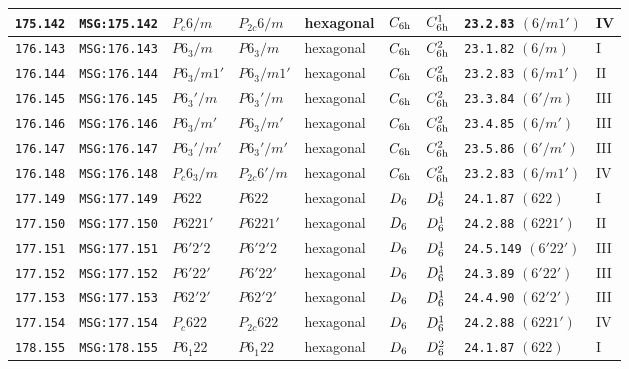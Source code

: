 \documentclass[fleqn,10pt]{jsarticle}
\begin{document}
\begin{center}
\begin{longtable}{lllllllll}
\texttt{175.142} & \texttt{MSG:175.142} & $P_{c}6/m$ & $P_{2c}6/m$ & hexagonal & $C_{\rm 6h}$ & $C_{\rm 6h}^{1}$ & \texttt{23.2.83} $(6/m1')$ & IV \\ \hline
\texttt{176.143} & \texttt{MSG:176.143} & $P6_{3}/m$ & $P6_{3}/m$ & hexagonal & $C_{\rm 6h}$ & $C_{\rm 6h}^{2}$ & \texttt{23.1.82} $(6/m)$ & I \\
\texttt{176.144} & \texttt{MSG:176.144} & $P6_{3}/m1'$ & $P6_{3}/m1'$ & hexagonal & $C_{\rm 6h}$ & $C_{\rm 6h}^{2}$ & \texttt{23.2.83} $(6/m1')$ & II \\
\texttt{176.145} & \texttt{MSG:176.145} & $P6_{3}'/m$ & $P6_{3}'/m$ & hexagonal & $C_{\rm 6h}$ & $C_{\rm 6h}^{2}$ & \texttt{23.3.84} $(6'/m)$ & III \\
\texttt{176.146} & \texttt{MSG:176.146} & $P6_{3}/m'$ & $P6_{3}/m'$ & hexagonal & $C_{\rm 6h}$ & $C_{\rm 6h}^{2}$ & \texttt{23.4.85} $(6/m')$ & III \\
\texttt{176.147} & \texttt{MSG:176.147} & $P6_{3}'/m'$ & $P6_{3}'/m'$ & hexagonal & $C_{\rm 6h}$ & $C_{\rm 6h}^{2}$ & \texttt{23.5.86} $(6'/m')$ & III \\
\texttt{176.148} & \texttt{MSG:176.148} & $P_{c}6_{3}/m$ & $P_{2c}6'/m$ & hexagonal & $C_{\rm 6h}$ & $C_{\rm 6h}^{2}$ & \texttt{23.2.83} $(6/m1')$ & IV \\ \hline
\texttt{177.149} & \texttt{MSG:177.149} & $P622$ & $P622$ & hexagonal & $D_{\rm 6}$ & $D_{\rm 6}^{1}$ & \texttt{24.1.87} $(622)$ & I \\
\texttt{177.150} & \texttt{MSG:177.150} & $P6221'$ & $P6221'$ & hexagonal & $D_{\rm 6}$ & $D_{\rm 6}^{1}$ & \texttt{24.2.88} $(6221')$ & II \\
\texttt{177.151} & \texttt{MSG:177.151} & $P6'2'2$ & $P6'2'2$ & hexagonal & $D_{\rm 6}$ & $D_{\rm 6}^{1}$ & \texttt{24.5.149} $(6'22')$ & III \\
\texttt{177.152} & \texttt{MSG:177.152} & $P6'22'$ & $P6'22'$ & hexagonal & $D_{\rm 6}$ & $D_{\rm 6}^{1}$ & \texttt{24.3.89} $(6'22')$ & III \\
\texttt{177.153} & \texttt{MSG:177.153} & $P62'2'$ & $P62'2'$ & hexagonal & $D_{\rm 6}$ & $D_{\rm 6}^{1}$ & \texttt{24.4.90} $(62'2')$ & III \\
\texttt{177.154} & \texttt{MSG:177.154} & $P_{c}622$ & $P_{2c}622$ & hexagonal & $D_{\rm 6}$ & $D_{\rm 6}^{1}$ & \texttt{24.2.88} $(6221')$ & IV \\ \hline
\texttt{178.155} & \texttt{MSG:178.155} & $P6_{1}22$ & $P6_{1}22$ & hexagonal & $D_{\rm 6}$ & $D_{\rm 6}^{2}$ & \texttt{24.1.87} $(622)$ & I \\

\end{longtable}
\end{center}
\end{document}
